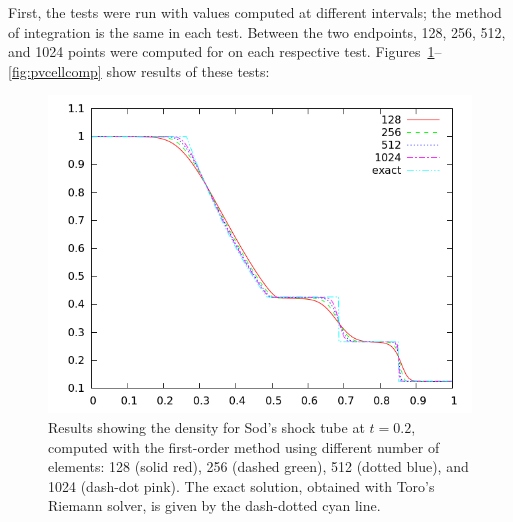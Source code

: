 \documentclass[10pt]{article}
\begin{document}
First, the tests were run with values computed at different intervals; the method of integration is the same in each test. Between the two endpoints, 128, 256, 512, and 1024 points were computed for on each respective test. Figures~\ref{fig:dencellcomp_20}--\ref{fig:pvcellcomp} show results of these tests:
\begin{figure}[h!]
  \begin{center}
    \includegraphics[width=.95\textwidth]{dencellcomp_20}
  \end{center}
  \caption{Results showing the density for Sod's shock tube at $t=0.2$, computed with the first-order method using different number of elements: 128 (solid red), 256 (dashed green), 512 (dotted blue), and 1024 (dash-dot pink).  The exact solution, obtained with Toro's Riemann solver, is given by the dash-dotted cyan line.}
  \label{fig:dencellcomp_20}
\end{figure}
\end{document}
